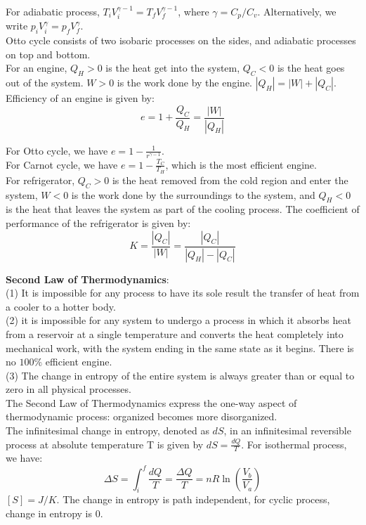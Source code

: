 \documentclass[10pt]{article}
\theoremstyle{break}
\theoremstyle{break}
\begin{document}
\newpage
For adiabatic process, $T_iV_i^{\gamma-1}= T_fV_f^{\gamma-1}$, where $\gamma = C_p / C_v$. Alternatively, we write $p_iV_i^{\gamma} = p_fV_f^{\gamma}$.\\

Otto cycle consists of two isobaric processes on the sides, and adiabatic processes on top and bottom.\\

For an engine, $Q_H>0$ is the heat get into the system, $Q_C<0$ is the heat goes out of the system. $W>0$ is the work done by the engine. $|Q_H| = |W| + |Q_C|$. Efficiency of an engine is given by:$$e = 1+\frac{Q_C}{Q_H} = \frac{|W|}{|Q_H|}$$ 

For Otto cycle, we have $e = 1- \frac{1}{r^{\gamma-1}}$.\\
For Carnot cycle, we have $e = 1 - \frac{T_C}{T_H}$, which is the most efficient engine.\\

For refrigerator, $Q_C>0$ is the heat removed from the cold region and enter the system, $W<0$ is the work done by the surroundings to the system, and $Q_H < 0$ is the heat that leaves the system as part of the cooling process. The coefficient of performance of the refrigerator is given by: $$K = \frac{|Q_C|}{|W|} = \frac{|Q_C|}{|Q_H| - |Q_C|}$$

\textbf{Second Law of Thermodynamics}:\\
(1) It is impossible for any process to have its sole result the transfer of heat from a cooler to a hotter body.\\
(2) it is impossible for any system
to undergo a process in which it absorbs heat from a reservoir at a single temperature and converts the heat completely into mechanical work, with the system ending in the same state as it begins. There is no $100\%$ efficient engine.\\
(3) The change in entropy of the entire system is always greater than or equal to zero in all
physical processes.\\
The Second Law of Thermodynamics express the one-way aspect of thermodynamic process:
organized becomes more disorganized.\\

The infinitesimal change in entropy, denoted as $dS$, in an infinitesimal reversible process at absolute temperature T is given by $dS =
\frac{dQ}{T}$. For isothermal process, we have: $$\Delta S = \int_i^f \frac{dQ}{T} = \frac{\Delta Q}{T} = nR\ln(\frac{V_b}{V_a})$$ $[S] = J/K$. The change in entropy is path independent, for cyclic process, change in entropy is $0$.\\
\end{document}
